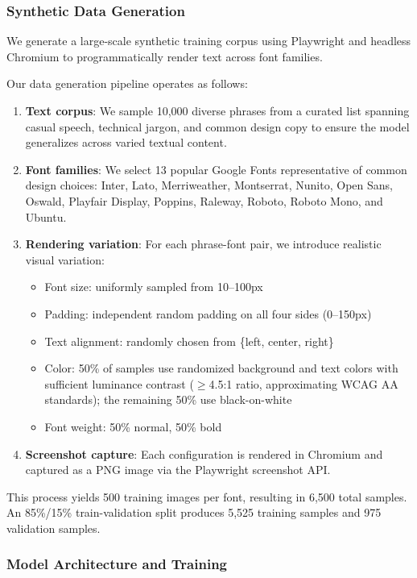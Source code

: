 \documentclass{article}
\begin{document}
\subsubsection{Synthetic Data Generation}
We generate a large-scale synthetic training corpus using Playwright and headless Chromium to programmatically render text across font families.

Our data generation pipeline operates as follows:
\begin{enumerate}
  \item \textbf{Text corpus}: We sample 10,000 diverse phrases from a curated list spanning casual
speech, technical jargon, and common design copy to ensure the model generalizes across varied textual content.

  \item \textbf{Font families}: We select 13 popular Google Fonts representative of common design
choices: Inter, Lato, Merriweather, Montserrat, Nunito, Open Sans, Oswald, Playfair Display,
Poppins, Raleway, Roboto, Roboto Mono, and Ubuntu.

  \item \textbf{Rendering variation}: For each phrase-font pair, we introduce realistic visual
variation:
  \begin{itemize}
      \item Font size: uniformly sampled from 10--100px
      \item Padding: independent random padding on all four sides (0--150px)
      \item Text alignment: randomly chosen from \{left, center, right\}
      \item Color: 50\% of samples use randomized background and text colors with sufficient
luminance contrast ($\geq$4.5:1 ratio, approximating WCAG AA standards); the remaining 50\% use
black-on-white
      \item Font weight: 50\% normal, 50\% bold
  \end{itemize}

  \item \textbf{Screenshot capture}: Each configuration is rendered in Chromium and captured as a
PNG image via the Playwright screenshot API.
\end{enumerate}

This process yields 500 training images per font, resulting in 6,500 total samples. An 85\%/15\% train-validation split produces 5,525 training samples and 975 validation samples.

\subsubsection{Model Architecture and Training}
\end{document}
